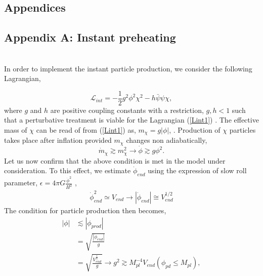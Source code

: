 \documentclass[prd,twocolumn,superscriptaddress]{revtex4}
\begin{document}
 \section*{\large Appendices}
 \begin{appendices}
 \chapter{\hspace{1cm}\bf Appendix A: Instant preheating} \label{appxA}
\vspace{.5cm} \\
In order to implement the instant particle production, we consider the following Lagrangian,

\begin{equation}
\mathscr{L}_{int} = - \frac{1}{2} g^2 \phi^2 \chi^2 - h \bar{\psi} \psi \chi, \label{Lint1}
\end{equation}
where $g$ and $h$ are positive coupling constants with a restriction, $g,h<1$ such that a perturbative treatment is viable for the Lagrangian (\ref{Lint1})
 \cite{SamiDadich,InstantPreheating,FermionPreheating,VariableGravity,ala}.
The  effective mass of $\chi$ can be read of from  (\ref{Lint1}) as,
$m_{\chi} = g \left| \phi \right|$, \cite{InstantPreheating2}.
Production of
$\chi$ particles takes place after inflation provided $m_{\chi}$ changes non adiabatically,
\cite{QIRGWBSamiSahni,VariableGravity,ala,SamiDadich}
\begin{equation}
\dot{m}_{\chi} \gtrsim m_{\chi}^2 \longrightarrow \dot{\phi} \gtrsim g \phi^2.
\end{equation}
Let us now confirm that the above condition is met in the model under consideration. To this effect,
we estimate  $\dot{\phi}_{end}$  using the expression of slow roll parameter,
  $\epsilon = 4 \pi G \frac{\dot{\phi}^2}{H^2}$ ,
\begin{eqnarray}
\label{dotphiend}
 \dot{\phi}_{end}^2 \simeq V_{end} \to |\dot{\phi}_{end}| \cong V_{end}^{1/2}
\end{eqnarray}
 The condition for particle production then becomes,
\begin{align}
\left| \phi \right| &\lesssim \left| \phi_{prod} \right| \nonumber \\
&= \sqrt{\frac{\left| \dot{\phi}_{end} \right|}{g}} \nonumber \\
&= \sqrt{\frac{V_{end}^{\frac{1}{2}}}{ g}} \longrightarrow g^2 \gtrsim M_{pl}^{-4} V_{end}
\left( \phi_{pd} \leq M_{pl} \right), \label{phiprod}
\end{align}

\end{appendices}
\end{document}
